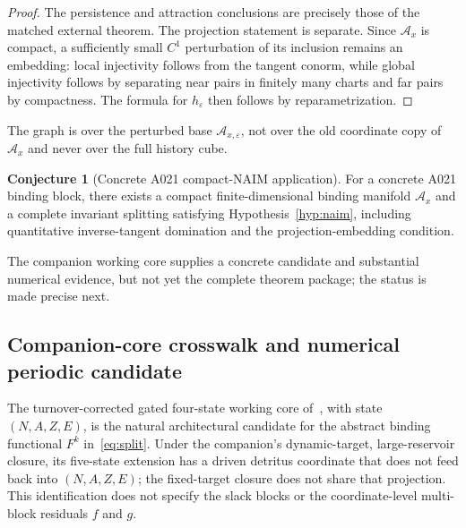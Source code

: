 \documentclass[11pt]{article}
\theoremstyle{definition}
\newtheorem{conjecture}{Conjecture}
\theoremstyle{remark}
\begin{document}
\begin{proof}
The persistence and attraction conclusions are precisely those of the matched external theorem. The projection statement is separate. Since $\mathcal A_x$ is compact, a sufficiently small $C^1$ perturbation of its inclusion remains an embedding: local injectivity follows from the tangent conorm, while global injectivity follows by separating near pairs in finitely many charts and far pairs by compactness. The formula for $h_\varepsilon$ then follows by reparametrization.\qedhere
\end{proof}

The graph is over the perturbed base $\mathcal A_{x,\varepsilon}$, not over the old coordinate copy of $\mathcal A_x$ and never over the full history cube.

\begin{conjecture}[Concrete A021 compact-NAIM application]
\label{conj:graph}
For a concrete A021 binding block, there exists a compact finite-dimensional binding manifold $\mathcal A_x$ and a complete invariant splitting satisfying Hypothesis~\ref{hyp:naim}, including quantitative inverse-tangent domination and the projection-embedding condition.
\end{conjecture}

The companion working core supplies a concrete candidate and substantial numerical evidence, but not yet the complete theorem package; the status is made precise next.

\subsection{Companion-core crosswalk and numerical periodic candidate}
\label{sec:c4-crosswalk}

The turnover-corrected gated four-state working core of~\cite{paperI}, with state $(N,A,Z,E)$, is the natural architectural candidate for the abstract binding functional $F^k$ in~\eqref{eq:split}. Under the companion's dynamic-target, large-reservoir closure, its five-state extension has a driven detritus coordinate that does not feed back into $(N,A,Z,E)$; the fixed-target closure does not share that projection. This identification does not specify the slack blocks or the coordinate-level multi-block residuals $f$ and $g$.
\end{document}
